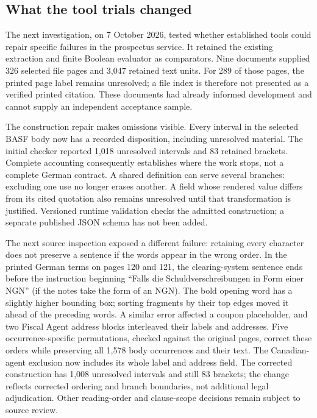 \subsection{What the tool trials changed}
\label{sec:prospectus-adoption-executed}

The next investigation, on 7 October 2026, tested whether established tools
could repair specific failures in the prospectus service. It retained the
existing extraction and finite Boolean evaluator as comparators. Nine documents
supplied 326 selected file pages and 3,047 retained text units. For 289 of those
pages, the printed page label remains unresolved; a file index is therefore not
presented as a verified printed citation. These documents had already informed
development and cannot supply an independent acceptance sample.

The construction repair makes omissions visible. Every interval in the selected
BASF body now has a recorded disposition, including unresolved material. The
initial checker reported 1,018 unresolved intervals and 83 retained brackets.
Complete accounting consequently establishes where the work stops,
not a complete German contract. A shared definition can serve several branches:
excluding one use no longer erases another. A field whose rendered value differs
from its cited quotation also remains unresolved until that transformation is
justified. Versioned runtime validation checks the admitted construction; a
separate published JSON schema has not been added.

\begingroup
{}
The next source inspection exposed a different failure: retaining every character
does not preserve a sentence if the words appear in the wrong order. In the
printed German terms on pages 120 and 121, the clearing-system sentence ends
before the instruction beginning ``Falls die Schuldverschreibungen in Form
einer NGN'' (if the notes take the form of an NGN). The bold opening word has a
slightly higher bounding box; sorting fragments by their top edges moved it
ahead of the preceding words. A similar error affected a coupon placeholder,
and two Fiscal Agent address blocks interleaved their labels and addresses.
Five occurrence-specific permutations, checked against the original pages,
correct these orders while preserving all 1,578 body occurrences and their text.
The Canadian-agent exclusion now includes its whole label and address field.
The corrected construction has 1,008 unresolved intervals and still 83 brackets;
the change reflects corrected ordering and branch boundaries, not additional
legal adjudication. Other reading-order and clause-scope decisions remain subject
to source review.
\par\endgroup

